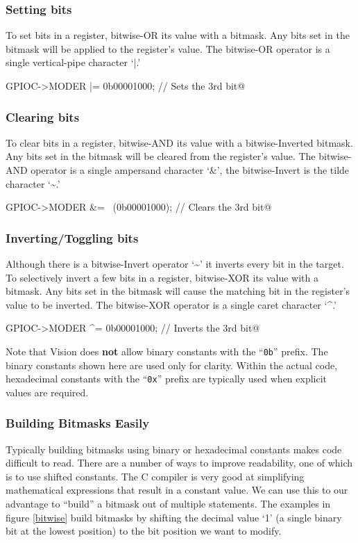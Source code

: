 \documentclass[11pt,fleqn]{book} %
\makeatletter
\newcommand{\ilcode}[1]{
    \smallskip
    \colorbox{gray!20!white}{
        \centering
        \parbox{\linewidth-2\fboxsep}{
            \lstinline@#1@
        }
    }
}
\makeatother
\begin{document}
\subsubsection{Setting bits}
To set bits in a register, bitwise-OR its value with a bitmask. Any bits set in the bitmask will be applied to the register's value. The bitwise-OR operator is a single vertical-pipe character `|.'

\ilcode{GPIOC->MODER |= 0b00001000;    // Sets the 3rd bit}%

\subsubsection{Clearing bits}
To clear bits in a register, bitwise-AND its value with a bitwise-Inverted bitmask. Any bits set in the bitmask will be cleared from the register's value. The bitwise-AND operator is a single ampersand character `\&', the bitwise-Invert is the tilde character `\textasciitilde.'

\ilcode{GPIOC->MODER \&= ~(0b00001000);    // Clears the 3rd bit}%

\subsubsection{Inverting/Toggling bits}
Although there is a bitwise-Invert operator `\textasciitilde' it inverts every bit in the target. To selectively invert a few bits in a register, bitwise-XOR its value with a bitmask. Any bits set in the bitmask will cause the matching bit in the register's value to be inverted. The bitwise-XOR operator is a single caret character `\textasciicircum.'

\ilcode{GPIOC->MODER ^= 0b00001000;    // Inverts the 3rd bit}%

\begin{warning}
    Note that {\textmu}Vision does \textbf{not} allow binary constants with the ``\texttt{0b}'' prefix. The binary constants shown here are used only for clarity. Within the actual code, hexadecimal constants with the ``\texttt{0x}'' prefix are typically used when explicit values are required.  
\end{warning}

\subsubsection{Building Bitmasks Easily}

Typically building bitmasks using binary or hexadecimal constants makes code difficult to read. There are a number of ways to improve readability, one of which is to use shifted constants. The C compiler is very good at simplifying mathematical expressions that result in a constant value. We can use this to our advantage to ``build'' a bitmask out of multiple statements. The examples in figure \vref{bitwise} build bitmasks by shifting the decimal value `1' (a single binary bit at the lowest position) to the bit position we want to modify.
\end{document}
